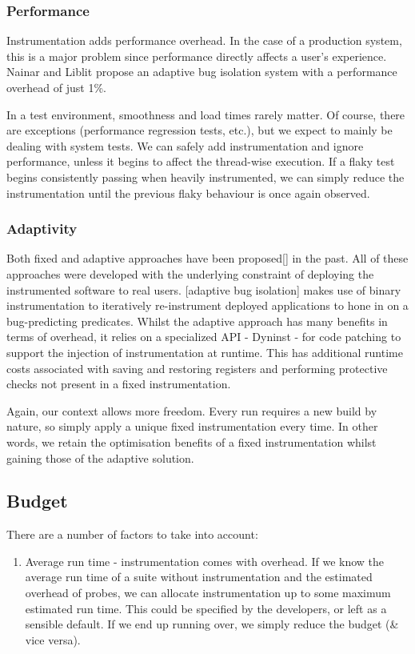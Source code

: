 \subsubsection{Performance}

Instrumentation adds performance overhead. In the case of a production system, this is a major problem since performance directly affects a user’s experience. Nainar and Liblit \cite{ArumugaNainar:2010:ABI:1806799.1806839} propose an adaptive bug isolation system with a performance overhead of just 1\%.

In a test environment, smoothness and load times rarely matter. Of course, there are exceptions (performance regression tests, etc.), but we expect to mainly be dealing with system tests. We can safely add instrumentation and ignore performance, unless it begins to affect the thread-wise execution. If a flaky test begins consistently passing when heavily instrumented, we can simply reduce the instrumentation until the previous flaky behaviour is once again observed.

\subsubsection{Adaptivity}

Both fixed and adaptive approaches have been proposed[] in the past. All of these approaches were developed with the underlying constraint of deploying the instrumented software to real users. [adaptive bug isolation] makes use of binary instrumentation to iteratively re-instrument deployed applications to hone in on a bug-predicting predicates. Whilst the adaptive approach has many benefits in terms of overhead, it relies on a specialized API - Dyninst - for code patching to support the injection of  instrumentation at runtime. This has additional runtime costs \cite{DyninstGuide} associated with saving and restoring registers and performing protective checks not present in a fixed instrumentation.

Again, our context allows more freedom. Every run requires a new build by nature, so simply apply a unique fixed instrumentation every time. In other words, we retain the optimisation benefits of a fixed instrumentation whilst gaining those of the adaptive solution.

\subsection{Budget}

There are a number of factors to take into account:

\begin{enumerate}
	\item Average run time - instrumentation comes with overhead. If we know the average run time of a suite without instrumentation and the estimated overhead of probes, we can allocate instrumentation up to some maximum estimated run time. This could be specified by the developers, or left as a sensible default. If we end up running over, we simply reduce the budget (\& vice versa).
\end{enumerate}
